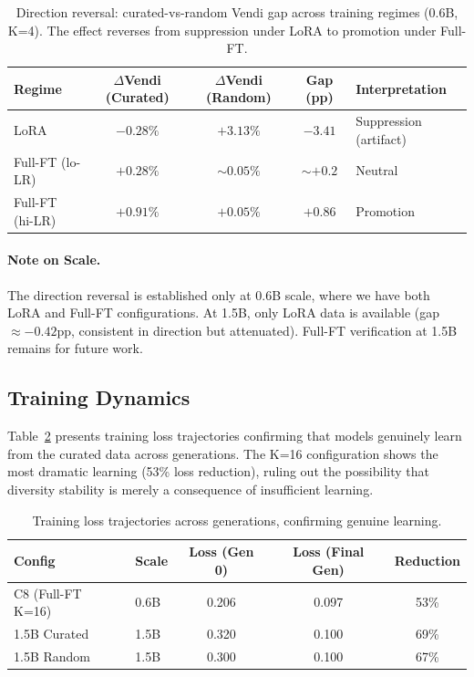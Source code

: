 \documentclass[11pt,a4paper]{article}
\begin{document}
\begin{table}[t]
\centering
\caption{Direction reversal: curated-vs-random Vendi gap across training regimes (0.6B, K=4). The effect reverses from suppression under LoRA to promotion under Full-FT.}
\label{tab:reversal}
\small
\begin{tabular}{@{}lcccl@{}}
\toprule
Regime & $\Delta$Vendi (Curated) & $\Delta$Vendi (Random) & Gap (pp) & Interpretation \\
\midrule
LoRA & $-0.28\%$ & $+3.13\%$ & $-3.41$ & Suppression (artifact) \\
Full-FT (lo-LR) & $+0.28\%$ & $\sim 0.05\%$ & $\sim +0.2$ & Neutral \\
Full-FT (hi-LR) & $+0.91\%$ & $+0.05\%$ & $+0.86$ & Promotion \\
\bottomrule
\end{tabular}
\end{table}

\paragraph{Note on Scale.} The direction reversal is established only at 0.6B scale, where we have both LoRA and Full-FT configurations. At 1.5B, only LoRA data is available (gap $\approx -0.42$pp, consistent in direction but attenuated). Full-FT verification at 1.5B remains for future work.

\subsection{Training Dynamics}

Table~\ref{tab:training_loss} presents training loss trajectories confirming that models genuinely learn from the curated data across generations. The K=16 configuration shows the most dramatic learning (53\% loss reduction), ruling out the possibility that diversity stability is merely a consequence of insufficient learning.

\begin{table}[t]
\centering
\caption{Training loss trajectories across generations, confirming genuine learning.}
\label{tab:training_loss}
\small
\begin{tabular}{@{}llccc@{}}
\toprule
Config & Scale & Loss (Gen 0) & Loss (Final Gen) & Reduction \\
\midrule
C8 (Full-FT K=16) & 0.6B & 0.206 & 0.097 & 53\% \\
1.5B Curated & 1.5B & 0.320 & 0.100 & 69\% \\
1.5B Random  & 1.5B & 0.300 & 0.100 & 67\% \\
\bottomrule
\end{tabular}
\end{table}
\end{document}
